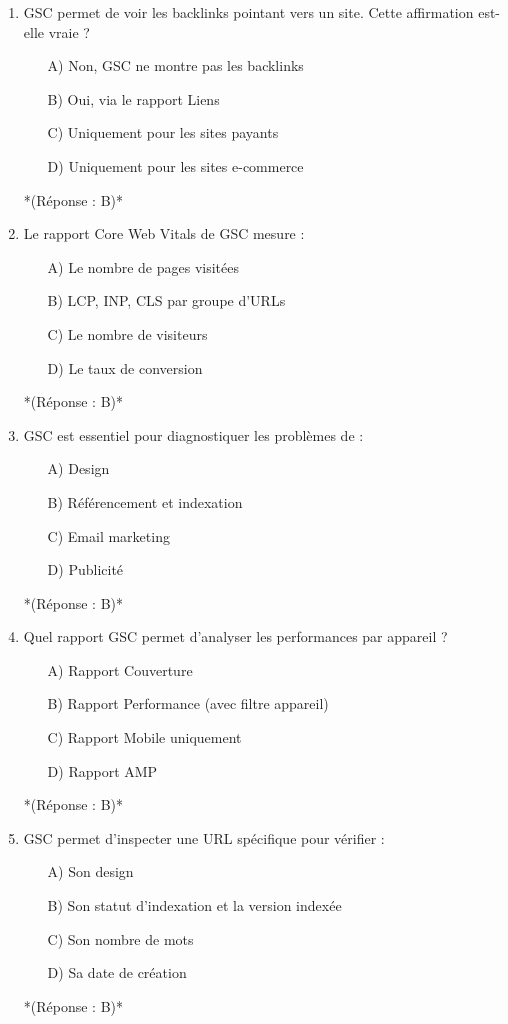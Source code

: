 \documentclass[12pt,a4paper,twoside]{report}
\begin{document}
\begin{enumerate}
    \item GSC permet de voir les backlinks pointant vers un site. Cette affirmation est-elle vraie ?
    \begin{itemize}
        \item[A)] Non, GSC ne montre pas les backlinks
        \item[B)] Oui, via le rapport Liens
        \item[C)] Uniquement pour les sites payants
        \item[D)] Uniquement pour les sites e-commerce
    \end{itemize}
    *(Réponse : B)*

    \item Le rapport Core Web Vitals de GSC mesure :
    \begin{itemize}
        \item[A)] Le nombre de pages visitées
        \item[B)] LCP, INP, CLS par groupe d'URLs
        \item[C)] Le nombre de visiteurs
        \item[D)] Le taux de conversion
    \end{itemize}
    *(Réponse : B)*

    \item GSC est essentiel pour diagnostiquer les problèmes de :
    \begin{itemize}
        \item[A)] Design
        \item[B)] Référencement et indexation
        \item[C)] Email marketing
        \item[D)] Publicité
    \end{itemize}
    *(Réponse : B)*

    \item Quel rapport GSC permet d'analyser les performances par appareil ?
    \begin{itemize}
        \item[A)] Rapport Couverture
        \item[B)] Rapport Performance (avec filtre appareil)
        \item[C)] Rapport Mobile uniquement
        \item[D)] Rapport AMP
    \end{itemize}
    *(Réponse : B)*

    \item GSC permet d'inspecter une URL spécifique pour vérifier :
    \begin{itemize}
        \item[A)] Son design
        \item[B)] Son statut d'indexation et la version indexée
        \item[C)] Son nombre de mots
        \item[D)] Sa date de création
    \end{itemize}
    *(Réponse : B)*


\end{enumerate}
\end{document}
